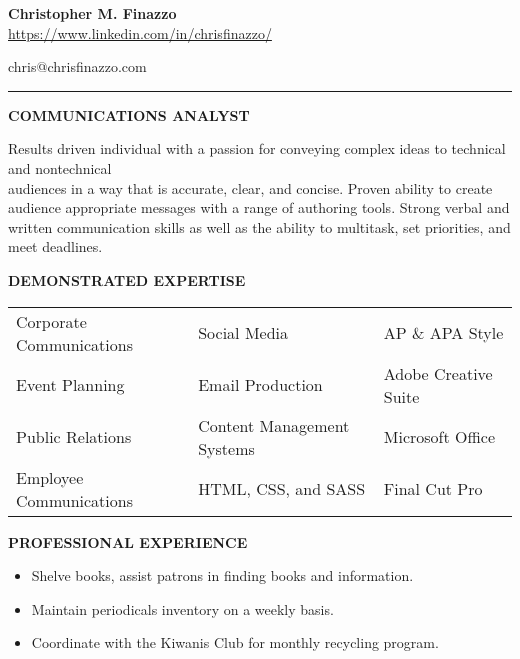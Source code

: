 \documentclass[letterpaper,12pt]{article}
\begin{document}
\begin{center}
\textbf
{\Large{Christopher M. Finazzo}} \\
\href{https://www.linkedin.com/in/chrisfinazzo/}{https://www.linkedin.com/in/chrisfinazzo/}
\end{center}
\hfill \hfill {chris@chrisfinazzo.com}
\vspace*{0.20cm}
\hrule
\vspace*{0.20cm}
\begin{center}
\textbf
{COMMUNICATIONS ANALYST}
\end{center}
\noindent
\begin{raggedright}
Results driven individual with a passion for conveying complex ideas to technical and nontechnical\\ audiences in a way that is accurate, clear, and concise. Proven ability to create audience appropriate messages with a range of authoring tools. Strong verbal and written communication skills as well as the ability to multitask, set priorities, and meet deadlines.\\
\end{raggedright}
\begin{center}
\textbf{DEMONSTRATED EXPERTISE}\\
\end{center}
\begin{center}
\begin{tabular}{lll}
Corporate Communications & Social Media & AP \& APA Style\\
Event Planning & Email Production & Adobe Creative Suite\\
Public Relations & Content Management Systems & Microsoft Office\\
Employee Communications & HTML, CSS, and SASS & Final Cut Pro\\
\end{tabular}
\end{center}
\begin{center}
\textbf{PROFESSIONAL EXPERIENCE}
\end{center}
%
\begin{itemize}[nosep]
\item
  Shelve books, assist patrons in finding books and information.
\item
  Maintain periodicals inventory on a weekly basis.
\item
  Coordinate with the Kiwanis Club for monthly recycling program.
\end{itemize}
\end{document}
